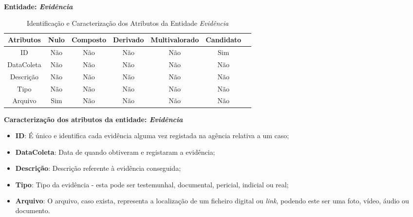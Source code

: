 \documentclass[a4paper,12pt]{scrreprt}
\newcommand{\Nao}{%
    \cellcolor{red!40}Não
}
\newcommand{\Sim}{%
    \cellcolor{green!40}Sim
}
\begin{document}
        \textbf{Entidade: \textit{Evidência}}
        \begin{table}[!ht]
        \centering
        \begin{tabular}{|c|c|c|c|c|c|c|}
        \hline
        \rowcolor{gray!20!white}
        \textbf{Atributos} & \textbf{Nulo} & \textbf{Composto} & \textbf{Derivado} & \textbf{Multivalorado} & \textbf{Candidato} \\
        \hline
        ID         & \Nao & \Nao & \Nao & \Nao & \Sim \\
        DataColeta & \Nao & \Nao & \Nao & \Nao & \Nao \\  
        Descrição  & \Nao & \Nao & \Nao & \Nao & \Nao \\
        Tipo       & \Nao & \Nao & \Nao & \Nao & \Nao \\
        Arquivo    & \Sim & \Nao & \Nao & \Nao & \Nao \\
        \hline
        \end{tabular}
        \caption{Identificação e Caracterização dos Atributos da Entidade \textit{Evidência}}
        \end{table}

        \textbf{Caracterização dos atributos da entidade: \textit{Evidência}}
        \begin{itemize}
            \item \textbf{ID}: É único e identifica cada evidência alguma vez registada na agência relativa a um caso; 
            \item \textbf{DataColeta}: Data de quando obtiveram e registaram a evidência; 
            \item \textbf{Descrição}: Descrição referente à evidência conseguida;
            \item \textbf{Tipo}: Tipo da evidência - esta pode ser testemunhal, documental, pericial, indicial ou real;
            \item \textbf{Arquivo}: O arquivo, caso exista, representa a localização de um ficheiro digital ou \textit{link}, podendo este ser uma foto, vídeo, áudio ou documento.
        \end{itemize}

        \vspace{1cm}
\end{document}
